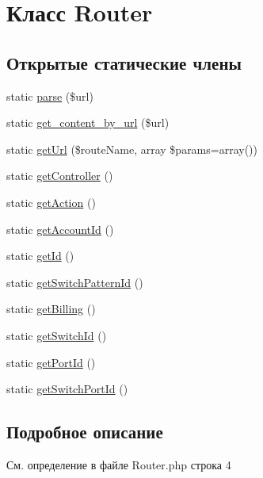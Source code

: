 \hypertarget{class_router}{\section{Класс Router}
\label{class_router}
}
\subsection*{Открытые статические члены}
\begin{DoxyCompactItemize}
\item 
static \hyperlink{class_router_ad6b0d5b03226bb27efd8c410c89ef635}{parse} (\$url)
\item 
static \hyperlink{class_router_a7e384b5b08035be60df7696428c6cf56}{get\-\_\-content\-\_\-by\-\_\-url} (\$url)
\item 
static \hyperlink{class_router_a45e9b6bbc2e0abd383bf9a788db25dab}{get\-Url} (\$route\-Name, array \$params=array())
\item 
static \hyperlink{class_router_a0c5216068060ca9253dbad31e5895a2b}{get\-Controller} ()
\item 
static \hyperlink{class_router_af8b331d3ac442a1071aa9f7db3b60637}{get\-Action} ()
\item 
static \hyperlink{class_router_a0613d1215434e1b563a42dfcd05aad60}{get\-Account\-Id} ()
\item 
static \hyperlink{class_router_acfaa3a96d0cb5a4c0d4d710dcba41e9e}{get\-Id} ()
\item 
static \hyperlink{class_router_a840ea571b8aba158c551449255edd0f0}{get\-Switch\-Pattern\-Id} ()
\item 
static \hyperlink{class_router_a3e855dbac26a97d146471aed73bf95dd}{get\-Billing} ()
\item 
static \hyperlink{class_router_abb3ae90eb2417cd21abc24a09cb80be2}{get\-Switch\-Id} ()
\item 
static \hyperlink{class_router_a09feae63fbc37283ebc79da382c365d9}{get\-Port\-Id} ()
\item 
static \hyperlink{class_router_adac4676835b368fa7ba7179b2feda666}{get\-Switch\-Port\-Id} ()
\end{DoxyCompactItemize}


\subsection{Подробное описание}


См. определение в файле Router.\-php строка 4



